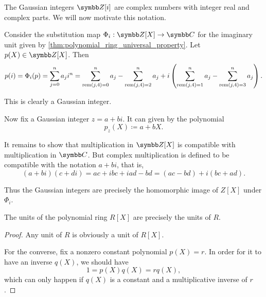 \begin{example}\label{ex:polynomial_evaluation_gaussian_integers}
  The Gaussian integers \( \Z[i] \) are complex numbers with integer real and complex parts. We will now motivate this notation.

  Consider the substitution map \( \Phi_i: \Z[X] \to \Co \) for the imaginary unit given by \cref{thm:polynomial_ring_universal_property}. Let \( p(X) \in \Z[X] \). Then
  \begin{equation*}
    p(i)
    =
    \Phi_i(p)
    =
    \sum_{j=0}^n a_j i^n
    =
    \sum_{\operatorname{rem}(j, 4) = 0}^n a_j - \sum_{\operatorname{rem}(j, 4) = 2}^n a_j + i \left(\sum_{\operatorname{rem}(j, 4) = 1}^n a_j - \sum_{\operatorname{rem}(j, 4) = 3}^n a_j \right).
  \end{equation*}

  This is clearly a Gaussian integer.

  Now fix a Gaussian integer \( z = a + bi \). It can given by the polynomial
  \begin{equation*}
    p_z(X) \coloneqq a + bX.
  \end{equation*}

  It remains to show that multiplication in \( \Z[X] \) is compatible with multiplication in \( \Co \). But complex multiplication is defined to be compatible with the notation \( a + bi \), that is,
  \begin{equation*}
    (a + bi) (c + di)
    =
    ac + ibc + iad - bd
    =
    (ac - bd) + i(bc + ad).
  \end{equation*}

  Thus the Gaussian integers are precisely the homomorphic image of \( Z[X] \) under \( \Phi_i \).
\end{example}

\begin{proposition}\label{thm:polynomial_ring_units}
  The units of the polynomial ring \( R[X] \) are precisely the units of \( R \).
\end{proposition}
\begin{proof}
  Any unit of \( R \) is obviously a unit of \( R[X] \).

  For the converse, fix a nonzero constant polynomial \( p(X) = r \). In order for it to have an inverse \( q(X) \), we should have
  \begin{equation*}
    1 = p(X) q(X) = r q(X),
  \end{equation*}
  which can only happen if \( q(X) \) is a constant and a multiplicative inverse of \( r \).
\end{proof}

